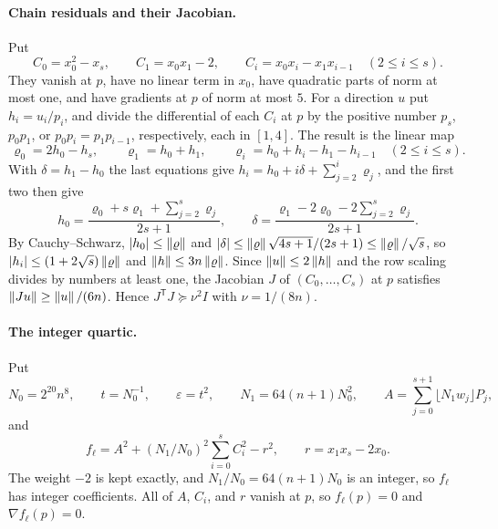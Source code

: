 \paragraph{Chain residuals and their Jacobian.}
Put
\[
 C_0=x_0^2-x_s,\qquad C_1=x_0x_1-2,\qquad C_i=x_0x_i-x_1x_{i-1}\quad
 (2\le i\le s).
\]
They vanish at $p$, have no linear term in $x_0$, have quadratic parts of
norm at most one, and have gradients at $p$ of norm at most $5$. For a
direction $u$ put $h_i=u_i/p_i$, and divide the differential of each $C_i$ at
$p$ by the positive number $p_s$, $p_0p_1$, or $p_0p_i=p_1p_{i-1}$,
respectively, each in $[1,4]$. The result is the linear map
\[
 \varrho_0=2h_0-h_s,\qquad \varrho_1=h_0+h_1,\qquad
 \varrho_i=h_0+h_i-h_1-h_{i-1}\quad(2\le i\le s).
\]
With $\delta=h_1-h_0$ the last equations give
$h_i=h_0+i\delta+\sum_{j=2}^i\varrho_j$, and the first two then give
\[
 h_0=\frac{\varrho_0+s\varrho_1+\sum_{j=2}^s\varrho_j}{2s+1},\qquad
 \delta=\frac{\varrho_1-2\varrho_0-2\sum_{j=2}^s\varrho_j}{2s+1}.
\]
By Cauchy--Schwarz, $|h_0|\le\left\lVert\varrho\right\rVert$ and
$|\delta|\le\left\lVert\varrho\right\rVert\sqrt{4s+1}/(2s+1)\le\left\lVert\varrho\right\rVert/\sqrt s$, so
$|h_i|\le(1+2\sqrt s)\left\lVert\varrho\right\rVert$ and $\left\lVert h\right\rVert\le3n\left\lVert\varrho\right\rVert$. Since
$\left\lVert u\right\rVert\le2\left\lVert h\right\rVert$ and the row scaling divides by numbers at least one,
the Jacobian $J$ of $(C_0,\ldots,C_s)$ at $p$ satisfies
$\left\lVert Ju\right\rVert\ge\left\lVert u\right\rVert/(6n)$. Hence $J^{\mathsf T}J\succeq\nu^2I$ with
$\nu=1/(8n)$.

\paragraph{The integer quartic.}
Put
\[
 N_0=2^{20}n^8,\qquad t=N_0^{-1},\qquad \varepsilon=t^2,\qquad
 N_1=64(n+1)N_0^2,\qquad A=\sum_{j=0}^{s+1}\lfloor N_1w_j\rfloor P_j,
\]
and
\begin{equation}
 f_\ell=A^2+(N_1/N_0)^2\sum_{i=0}^sC_i^2-r^2,\qquad r=x_1x_s-2x_0 .
 \label{eq:fields-prime-quartic}
\end{equation}
The weight $-2$ is kept exactly, and $N_1/N_0=64(n+1)N_0$ is an integer, so
$f_\ell$ has integer coefficients. All of $A$, $C_i$, and $r$ vanish at $p$,
so $f_\ell(p)=0$ and $\nabla f_\ell(p)=0$.

